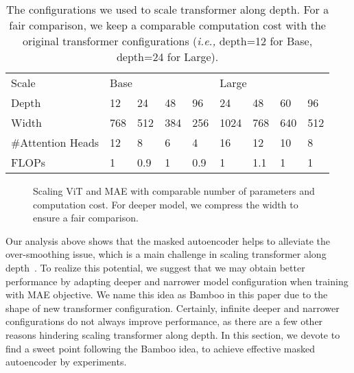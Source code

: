 \documentclass{article}
\theoremstyle{plain}
\theoremstyle{definition}
\theoremstyle{remark}
\newcommand{\ie}{\emph{i.e.,}\xspace}
\begin{document}
\begin{table*}[t]
\caption{The configurations we used to scale transformer along depth. For a fair comparison, we keep a comparable computation cost with the original transformer configurations (\ie depth=12 for Base, depth=24 for Large).}
\centering
\small
\begin{tabular}{l llll llll}
\toprule 
Scale                  & \multicolumn{4}{l}{Base} & \multicolumn{4}{l}{Large} \\  \cmidrule(lr){2-5}\cmidrule(lr){6-9}
Depth             & 12   & 24   & 48   & 96  & 24    & 48   & 60   & 96  \\ 
Width             & 768  & 512  & 384  & 256 & 1024  & 768  & 640  & 512 \\
\#Attention Heads & 12   & 8    & 6    & 4   & 16    & 12   & 10   & 8   \\
FLOPs  & 1    & 0.9  & 1    & 0.9 & 1    & 1.1  & 1    & 1  \\ \bottomrule
\end{tabular}
\vspace{-0.4cm}
\label{tbl:config-explore}
\end{table*}




\begin{figure}[t]
\centering
{}\vspace{-0.35cm}

\vspace{-0.35cm}
\caption{Scaling ViT and MAE with comparable number of parameters and computation cost. For deeper model, we compress the width to ensure a fair comparison.}
\label{fig:sweet}
\vspace{-0.4cm}
\end{figure}


Our analysis above shows that the masked autoencoder helps to alleviate the over-smoothing issue, which is a main challenge in scaling transformer along depth~\cite{zhou2021deepvit,dong2021attention}. To realize this potential, we suggest that we may obtain better performance by adapting deeper and narrower model configuration when training with MAE objective. We name this idea as Bamboo in this paper due to the shape of new transformer configuration.
Certainly, infinite deeper and narrower configurations do not always improve performance, as there are a few other reasons hindering scaling transformer along depth. In this section, we devote to find a sweet point following the Bamboo idea, to achieve effective masked autoencoder by experiments.
\end{document}
